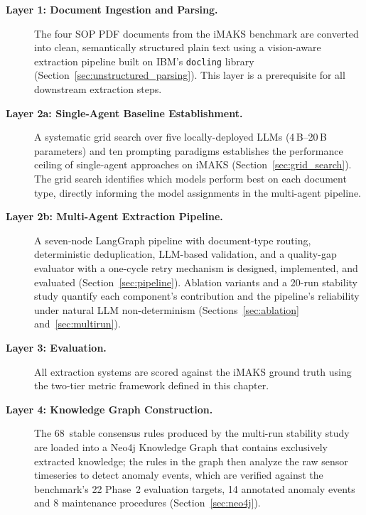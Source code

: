 ﻿\documentclass[11pt]{article}
\begin{document}
\begin{description}
    \item[\textbf{Layer 1: Document Ingestion and Parsing.}]
          The four SOP PDF documents from the iMAKS benchmark are converted into
          clean, semantically structured plain text using a vision-aware extraction
          pipeline built on IBM's \texttt{docling} library
          (Section~\ref{sec:unstructured_parsing}).
          This layer is a prerequisite for all downstream extraction steps.

    \item[\textbf{Layer 2a: Single-Agent Baseline Establishment.}]
          A systematic grid search over five locally-deployed LLMs
          (4\,B--20\,B parameters) and ten prompting paradigms establishes the
          performance ceiling of single-agent approaches on iMAKS
          (Section~\ref{sec:grid_search}).
          The grid search identifies which models perform best on each document
          type, directly informing the model assignments in the multi-agent
          pipeline.

    \item[\textbf{Layer 2b: Multi-Agent Extraction Pipeline.}]
          A seven-node LangGraph pipeline with document-type routing, deterministic
          deduplication, LLM-based validation, and a quality-gap evaluator with a
          one-cycle retry mechanism is designed, implemented, and evaluated
          (Section~\ref{sec:pipeline}).
          Ablation variants and a 20-run stability study quantify each
          component's contribution and the pipeline's reliability under natural
          LLM non-determinism (Sections~\ref{sec:ablation} and~\ref{sec:multirun}).

    \item[\textbf{Layer 3: Evaluation.}]
          All extraction systems are scored against the iMAKS ground truth using
          the two-tier metric framework defined in this chapter.

    \item[\textbf{Layer 4: Knowledge Graph Construction.}]
          The 68~stable consensus rules produced by the multi-run stability study
          are loaded into a Neo4j Knowledge Graph that contains exclusively
          extracted knowledge; the rules in the graph then analyze the raw
          sensor timeseries to detect anomaly events, which are verified
          against the benchmark's 22 Phase~2 evaluation targets, 14
          annotated anomaly events and 8 maintenance procedures
          (Section~\ref{sec:neo4j}).
\end{description}
\end{document}
